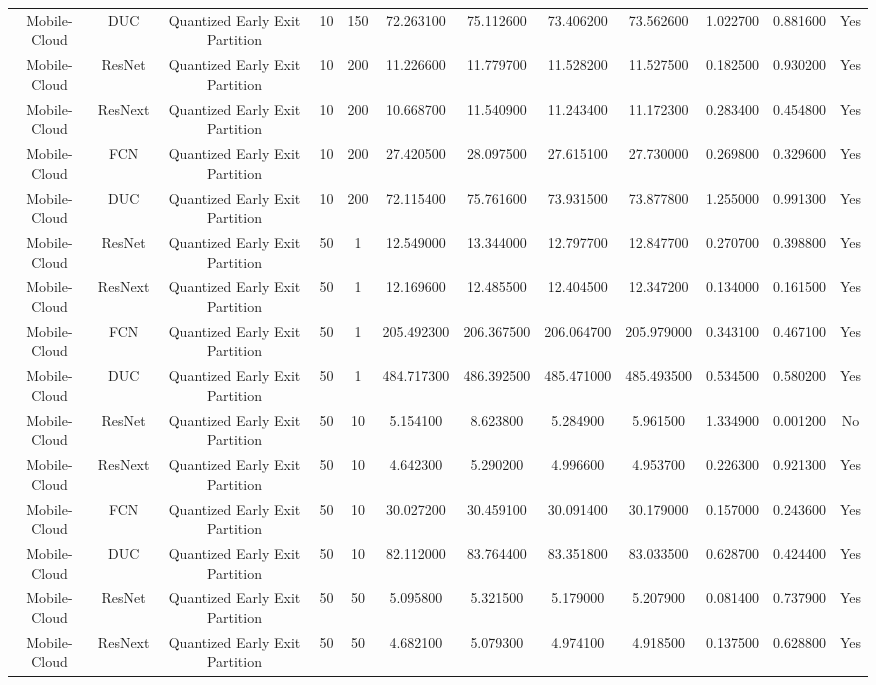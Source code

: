 \begin{tabular}{|c||c||c||c||c||c||c||c||c||c||c||c|}
Mobile-Cloud & DUC & Quantized Early Exit Partition & 10 & 150 & 72.263100 & 75.112600 & 73.406200 & 73.562600 & 1.022700 & 0.881600 & Yes \\
Mobile-Cloud & ResNet & Quantized Early Exit Partition & 10 & 200 & 11.226600 & 11.779700 & 11.528200 & 11.527500 & 0.182500 & 0.930200 & Yes \\
Mobile-Cloud & ResNext & Quantized Early Exit Partition & 10 & 200 & 10.668700 & 11.540900 & 11.243400 & 11.172300 & 0.283400 & 0.454800 & Yes \\
Mobile-Cloud & FCN & Quantized Early Exit Partition & 10 & 200 & 27.420500 & 28.097500 & 27.615100 & 27.730000 & 0.269800 & 0.329600 & Yes \\
Mobile-Cloud & DUC & Quantized Early Exit Partition & 10 & 200 & 72.115400 & 75.761600 & 73.931500 & 73.877800 & 1.255000 & 0.991300 & Yes \\
Mobile-Cloud & ResNet & Quantized Early Exit Partition & 50 & 1 & 12.549000 & 13.344000 & 12.797700 & 12.847700 & 0.270700 & 0.398800 & Yes \\
Mobile-Cloud & ResNext & Quantized Early Exit Partition & 50 & 1 & 12.169600 & 12.485500 & 12.404500 & 12.347200 & 0.134000 & 0.161500 & Yes \\
Mobile-Cloud & FCN & Quantized Early Exit Partition & 50 & 1 & 205.492300 & 206.367500 & 206.064700 & 205.979000 & 0.343100 & 0.467100 & Yes \\
Mobile-Cloud & DUC & Quantized Early Exit Partition & 50 & 1 & 484.717300 & 486.392500 & 485.471000 & 485.493500 & 0.534500 & 0.580200 & Yes \\
Mobile-Cloud & ResNet & Quantized Early Exit Partition & 50 & 10 & 5.154100 & 8.623800 & 5.284900 & 5.961500 & 1.334900 & 0.001200 & No \\
Mobile-Cloud & ResNext & Quantized Early Exit Partition & 50 & 10 & 4.642300 & 5.290200 & 4.996600 & 4.953700 & 0.226300 & 0.921300 & Yes \\
Mobile-Cloud & FCN & Quantized Early Exit Partition & 50 & 10 & 30.027200 & 30.459100 & 30.091400 & 30.179000 & 0.157000 & 0.243600 & Yes \\
Mobile-Cloud & DUC & Quantized Early Exit Partition & 50 & 10 & 82.112000 & 83.764400 & 83.351800 & 83.033500 & 0.628700 & 0.424400 & Yes \\
Mobile-Cloud & ResNet & Quantized Early Exit Partition & 50 & 50 & 5.095800 & 5.321500 & 5.179000 & 5.207900 & 0.081400 & 0.737900 & Yes \\
Mobile-Cloud & ResNext & Quantized Early Exit Partition & 50 & 50 & 4.682100 & 5.079300 & 4.974100 & 4.918500 & 0.137500 & 0.628800 & Yes \\

\end{tabular}
